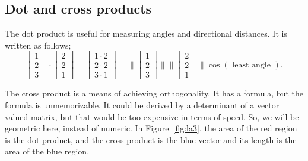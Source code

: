 \subsection{Dot and cross products}

The dot product is useful for measuring angles and directional distances.
It is written as follows;
\[
    \begin{bmatrix}
        1 \\ 2 \\ 3
    \end{bmatrix}
    \cdot 
    \begin{bmatrix}
        2 \\ 2 \\ 1
    \end{bmatrix}
    =
    \begin{bmatrix}
        1\cdot2 \\ 2\cdot2 \\ 3\cdot1
    \end{bmatrix}
    =
    \Biggl\lVert
    \begin{bmatrix}
        1 \\ 2 \\ 3
    \end{bmatrix}
    \Biggr\rVert
    \Biggl\lVert
    \begin{bmatrix}
        2 \\ 2 \\ 1
    \end{bmatrix}
    \Biggr\rVert
    \cos(\mbox{ least angle }).
\]

The cross product is a means of achieving orthogonality.
It has a formula, but the formula is unmemorizable.
It could be derived by a determinant of a vector valued matrix,
but that would be too expensive in terms of speed. So, we will be 
geometric here, instead of numeric. In Figure~\ref{fig:la3},
the area of the red region is the dot product, and the cross product is 
the blue vector and its length is the area of the blue region.

